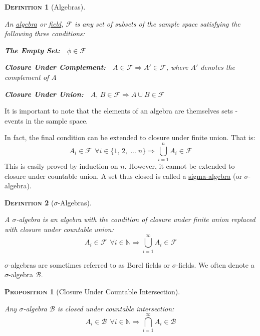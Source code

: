 \documentclass[12pt,a4paper]{article}
\newtheorem{definition}{\textsc{Definition}}[section]
\newtheorem{proposition}{\textsc{Proposition}}[section]
\begin{document}
\begin{definition}[Algebras]$\;$\par
\vspace{12pt}

An \underline{algebra} or \underline{field}, $\mathcal{F}$ is any set of subsets of the sample space satisfying the following three conditions:\par
\vspace{10pt}
{\bf The Empty Set:}$\quad\phi\in\mathcal{F}$\par
\vspace{10pt}
{\bf Closure Under Complement:}$\quad A\in\mathcal{F}\Rightarrow A'\in\mathcal{F}$, where $A'$ denotes the complement of A\par
\vspace{10pt}
{\bf Closure Under Union:}$\quad A,\,B\in\mathcal{F}\Rightarrow A\cup B\in\mathcal{F}$\par
\vspace{12pt}
\end{definition}

\noindent It is important to note that the elements of an algebra are themselves sets - events in the sample space.\par
\vspace{12pt}

\noindent In fact, the final condition can be extended to closure under finite union. That is:
$$A_i \in\mathcal{F}\:\:\forall i\in\{1,\,2,\;...\;n\}\Rightarrow\bigcup_{i=1}^{n}A_i\in\mathcal{F}$$
This is easily proved by induction on $n$. However, it cannot be extended to closure under countable union. A set thus closed is called a \underline{sigma-algebra} (or $\sigma$-algebra).

\begin{definition}[$\sigma$-Algebras]$\;$\par
\vspace{12pt}

A $\sigma$-algebra is an algebra with the condition of closure under finite union replaced with closure under countable union:
$$A_i\in\mathcal{F}\:\:\forall i\in\mathbb{N}\Rightarrow\bigcup_{i=1}^{\infty}A_i\in\mathcal{F}$$\end{definition}

\noindent $\sigma$-algebras are sometimes referred to as Borel fields or $\sigma$-fields. We often denote a $\sigma$-algebra $\mathcal{B}$.

\begin{proposition}[Closure Under Countable Intersection]$\;$\par
\vspace{12pt}

Any $\sigma$-algebra $\mathcal{B}$ is closed under countable intersection:
$$A_i\in\mathcal{B}\:\:\forall i\in\mathbb{N}\Rightarrow\bigcap_{i=1}^{\infty}A_i\in\mathcal{B}$$\end{proposition}
\end{document}
